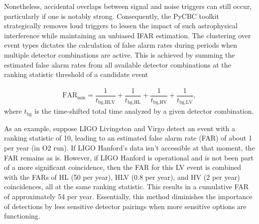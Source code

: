 Nonetheless, accidental overlaps between signal and noise triggers can still occur, particularly if one is notably strong. Consequently, the PyCBC toolkit strategically removes loud triggers to lessen the impact of such astrophysical interference while maintaining an unbiased IFAR estimation. The clustering over event types dictates the calculation of false alarm rates during periods when multiple detector combinations are active. This is achieved by summing the estimated false alarm rates from all available detector combinations at the ranking statistic threshold of a candidate event \cite{Davies:2020tsx}

\begin{align}
    \text{FAR}_{\min} = \dfrac{1}{t_{\text{bg,HLV}}} + \dfrac{1}{t_{\text{bg,HL}}} + \dfrac{1}{t_{\text{bg,HV}}} + \dfrac{1}{t_{\text{bg,LV}}},
\end{align}
where $t_{\text{bg}}$ is the time-shifted total time analyzed by a given detector combination.

As an example, suppose LIGO Livingston and Virgo detect an event with a ranking statistic of 10, leading to an estimated false alarm rate (FAR) of about 1 per year (in O2 run). If LIGO Hanford's data isn't accessible at that moment, the FAR remains as is. However, if LIGO Hanford is operational and is not been part of a more significant coincidence, then the FAR for this LV event is combined with the FARs of HL (50 per year), HLV (0.8 per year), and HV (2 per year) coincidences, all at the same ranking statistic. This results in a cumulative FAR of approximately 54 per year. Essentially, this method diminishes the importance of detections by less sensitive detector pairings when more sensitive options are functioning.


